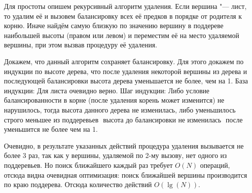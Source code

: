 Для простоты опишем рекурсивный алгоритм удаления.
Если вершина "--- лист, то удалим её и вызовем балансировку всех её предков в порядке от родителя к корню.
Иначе найдём самую близкую по значению вершину в поддереве наибольшей высоты (правом или левом) и переместим её на место удаляемой вершины,
при этом вызвав процедуру её удаления.

Докажем, что данный алгоритм сохраняет балансировку.
Для этого докажем по индукции по высоте дерева,
что после удаления некоторой вершины из дерева и
последующей балансировки высота дерева уменьшается не более, чем на 1.
База индукции: Для листа очевидно верно.
Шаг индукции: Либо условие балансированности в корне (после удаления корень может изменится) не нарушилось,
тогда высота данного дерева не изменилась,
либо уменьшилось строго меньшее из поддеревьев $ $
высота до балансировки не изменилась $ $
после уменьшится не более чем на 1.

Очевидно, в результате указанных действий процедура удаления вызывается не более 3 раз,
так как у вершины, удаляемой по 2-му вызову, нет одного из поддеревьев.
Но поиск ближайшего каждый раз требует $O(N)$ операций,
отсюда видна очевидная оптимизация:
поиск ближайшей вершины производится по краю поддерева.
Отсюда количество действий $O(\lg(N))$.